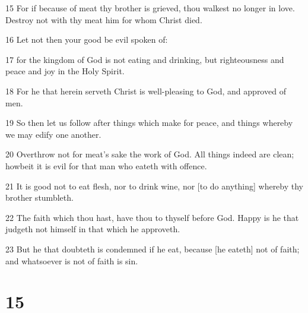 \par 15 For if because of meat thy brother is grieved, thou walkest no longer in love. Destroy not with thy meat him for whom Christ died.
\par 16 Let not then your good be evil spoken of:
\par 17 for the kingdom of God is not eating and drinking, but righteousness and peace and joy in the Holy Spirit.
\par 18 For he that herein serveth Christ is well-pleasing to God, and approved of men.
\par 19 So then let us follow after things which make for peace, and things whereby we may edify one another.
\par 20 Overthrow not for meat's sake the work of God. All things indeed are clean; howbeit it is evil for that man who eateth with offence.
\par 21 It is good not to eat flesh, nor to drink wine, nor [to do anything] whereby thy brother stumbleth.
\par 22 The faith which thou hast, have thou to thyself before God. Happy is he that judgeth not himself in that which he approveth.
\par 23 But he that doubteth is condemned if he eat, because [he eateth] not of faith; and whatsoever is not of faith is sin.

\chapter{15}

